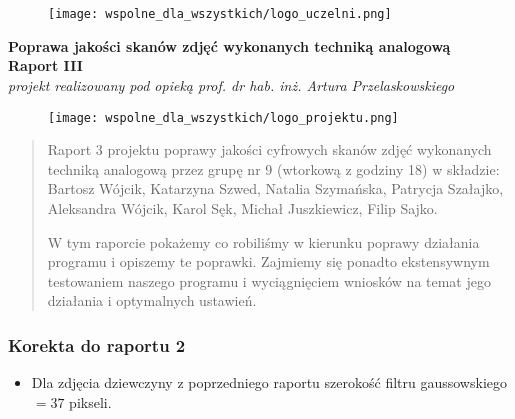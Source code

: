 \documentclass[]{mwart}
\begin{document}
\newpage

\part{}
\thispagestyle{empty}

\begin{figure}[h]
    \centering
    \texttt{[image: wspolne\_dla\_wszystkich/logo\_uczelni.png]}
\end{figure}


\begin{center}
    {\LARGE \textbf{Poprawa jakości skanów zdjęć wykonanych techniką analogową
        }} \\[0.3cm]
    {\large \textbf{Raport III}} \\[0.2cm]
    \textit{projekt realizowany pod opieką prof. dr hab. inż. Artura Przelaskowskiego}

\end{center}

\begin{figure}[h]
    \centering
    \texttt{[image: wspolne\_dla\_wszystkich/logo\_projektu.png]}
\end{figure}

\vfill
\begin{abstract}
    Raport 3 projektu poprawy jakości cyfrowych skanów zdjęć wykonanych techniką analogową przez grupę nr 9 (wtorkową z godziny 18)
    w składzie:  Bartosz Wójcik, Katarzyna Szwed, Natalia Szymańska,
    Patrycja Szałajko, Aleksandra Wójcik, Karol Sęk, Michał Juszkiewicz, Filip Sajko.

    W tym raporcie pokażemy co robiliśmy w kierunku poprawy działania programu i opiszemy te poprawki.
    Zajmiemy się ponadto ekstensywnym testowaniem naszego programu i wyciągnięciem wniosków na temat jego działania i optymalnych ustawień.
\end{abstract}


\newpage

\section{Korekta do raportu 2}
\begin{itemize}
    \item Dla zdjęcia dziewczyny z poprzedniego raportu szerokość filtru gaussowskiego $ =  37$ pikseli.
\end{itemize}
\end{document}
